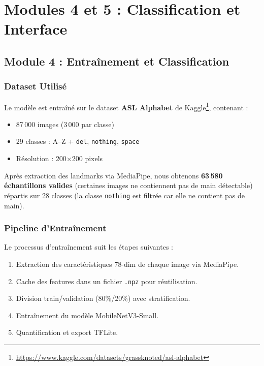 \chapter{Modules 4 et 5 : Classification et Interface}

\section{Module 4 : Entraînement et Classification}

\subsection{Dataset Utilisé}

Le modèle est entraîné sur le dataset \textbf{ASL Alphabet} de Kaggle\footnote{\url{https://www.kaggle.com/datasets/grassknoted/asl-alphabet}}, contenant :
\begin{itemize}
    \item 87\,000 images (3\,000 par classe)
    \item 29 classes : A--Z + \texttt{del}, \texttt{nothing}, \texttt{space}
    \item Résolution : 200$\times$200 pixels
\end{itemize}

Après extraction des landmarks via MediaPipe, nous obtenons \textbf{63\,580 échantillons valides} (certaines images ne contiennent pas de main détectable) répartis sur 28 classes (la classe \texttt{nothing} est filtrée car elle ne contient pas de main).

\subsection{Pipeline d'Entraînement}

Le processus d'entraînement suit les étapes suivantes :

\begin{enumerate}
    \item Extraction des caractéristiques 78-dim de chaque image via MediaPipe.
    \item Cache des features dans un fichier \texttt{.npz} pour réutilisation.
    \item Division train/validation (80\%/20\%) avec stratification.
    \item Entraînement du modèle MobileNetV3-Small.
    \item Quantification et export TFLite.
\end{enumerate}

